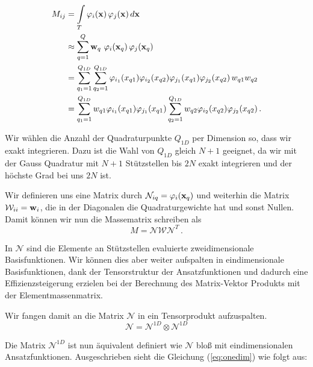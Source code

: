 \begin{equation} \label{eq:massapprox}
\begin{aligned}
M_{ij} &= \int\limits_{T} \varphi_i (\bold{x}) \, \varphi_j (\bold{x}) \, d\bold{x} \\
&\approx  \sum\limits_{q=1}^Q \bold{w}_q \, \, \varphi_i (\bold{x}_q) \, \varphi_j (\bold{x}_q) \\
&= \sum\limits_{q_1=1}^{Q_{1D}} \sum\limits_{q_2=1}^{Q_{1D}} \varphi_{i_1}(x_{q1}) \varphi_{i_2}(x_{q2}) \varphi_{j_1}(x_{q1}) \varphi_{j_2}(x_{q2}) \, w_{q1} w_{q2} \\ 
&= \sum\limits_{q_1=1}^{Q_{1D}} w_{q1} \varphi_{i_1}(x_{q1}) \varphi_{j_1}(x_{q1}) \sum\limits_{q_2=1}^{Q_{1D}} w_{q2} \varphi_{i_2}(x_{q2}) \varphi_{j_2}(x_{q2}) \, . 
\end{aligned}
\end{equation}

Wir wählen die Anzahl der Quadraturpunkte $Q_{1D}$ per Dimension so, dass wir exakt integrieren. Dazu ist die Wahl von $Q_{1D}$ gleich $N+1$ geeignet, da wir mit der Gauss Quadratur mit $N+1$ Stützstellen bis $2N$ exakt integrieren und der höchste Grad bei uns $2N$ ist.

Wir definieren uns eine Matrix durch $\mathcal{N}_{iq}=\varphi_i(\bold{x}_q)$ und weiterhin die Matrix $\mathcal{W}_{ii}=\bold{w}_i$, die in der Diagonalen die Quadraturgewichte hat und sonst Nullen. Damit können wir nun die Massematrix schreiben als
\begin{equation}
M = \mathcal{N} \mathcal{W} \mathcal{N}^T \, .
\end{equation}

In $\mathcal{N}$ sind die Elemente an Stützstellen evaluierte zweidimensionale Basisfunktionen. Wir können dies aber weiter aufspalten in eindimensionale Basisfunktionen, dank der Tensorstruktur der Ansatzfunktionen und dadurch eine Effizienzsteigerung erzielen bei der Berechnung des Matrix-Vektor Produkts mit der Elementmassenmatrix.

Wir fangen damit an die Matrix $\mathcal{N}$ in ein Tensorprodukt aufzuspalten. 
\begin{equation} \label{eq:onedim}
\mathcal{N} = \mathcal{N}^{1D} \otimes \mathcal{N}^{1D}
\end{equation}

Die Matrix $\mathcal{N}^{1D}$ ist nun äquivalent definiert wie $\mathcal{N}$ bloß mit eindimensionalen Ansatzfunktionen. Ausgeschrieben sieht die Gleichung (\ref{eq:onedim}) wie folgt aus:

